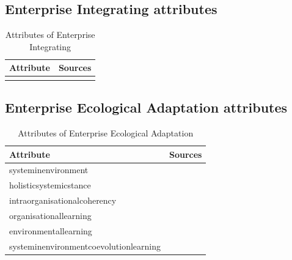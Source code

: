 \subsection{Enterprise Integrating attributes}
\label{sub:attributesofenterpriseintegrating}
\begin{table}[H]%
	\begin{center}%
		\begin{tabular}{@{}ll@{}}%
			\toprule%
			\textbf{Attribute} & \textbf{Sources} \\%
			\midrule%
			 & \parencite{Lapalme2012} \\%
			\bottomrule%
		\end{tabular}%
		\caption[Attributes of Enterprise Integrating]{Attributes of Enterprise Integrating}%
		\label{tab:attributesofenterpriseintegrating}%
	\end{center}%
\end{table}%

\subsection{Enterprise Ecological Adaptation attributes}
\label{sub:enterpriseecologicaladaptation}

\begin{table}[H]
	\begin{center}
		\begin{tabular}{@{}ll@{}}
				\toprule
				\textbf{Attribute} & \textbf{Sources} \\%
				\midrule%
				\Gls{systeminenvironment} & \parencite{Lapalme2012} \\%
				\Gls{holisticsystemicstance} & \parencite{Lapalme2012} \\%
				\Gls{intraorganisationalcoherency} & \parencite{Lapalme2012} \\%
				\Gls{organisationallearning} & \parencite{Lapalme2012} \\%
				\Gls{environmentallearning} & \parencite{Lapalme2012} \\%
				\Gls{systeminenvironmentcoevolutionlearning} & \parencite{Lapalme2012} \\%
				\bottomrule%
			\end{tabular}
		\caption[Attributes of Enterprise Ecological Adaptation]{Attributes of Enterprise Ecological Adaptation}
		\label{tab:attributesofeea}
	\end{center}
\end{table}


